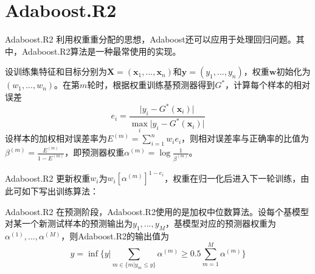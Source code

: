 \documentclass{ctexbeamer}        %
\begin{document}
\section{Adaboost.R2}
\begin{frame}{Adaboost.R2}
利用权重重分配的思想，Adaboost还可以应用于处理回归问题。其中，Adaboost.R2算法是一种最常使用的实现。
\newline

设训练集特征和目标分别为$\mathbf{X}=(\mathbf{x}_1, ..., \mathbf{x}_n)$和$\mathbf{y}=(y_1,...,y_n)$，权重$\mathbf{w}$初始化为$(w_1,...,w_n)$。在第$m$轮时，根据权重训练基预测器得到$G^*$，计算每个样本的相对误差
$$
e_{i}=\frac{\vert y_i-G^*(\mathbf{x}_i)\vert}{\max_i \vert y_i-G^*(\mathbf{x}_i)\vert}
$$
设样本的加权相对误差率为$E^{(m)}=\sum_{i=1}^n w_ie_i$，则相对误差率与正确率的比值为$\beta^{(m)}=\frac{E^{(m)}}{1-E^{(m)}}$，即预测器权重$\alpha^{(m)}=\log \frac{1}{\beta^{(m)}}$。
\end{frame}
\begin{frame}{Adaboost.R2}
更新权重$w_i$为$w_{i}[\alpha^{(m)}]^{1-e_{i}}$，权重在归一化后进入下一轮训练，由此可如下写出训练算法：
\begin{center}
\end{center}

\end{frame}
\begin{frame}{Adaboost.R2}
在预测阶段，Adaboost.R2使用的是加权中位数算法。设每个基模型对某一个新测试样本的预测输出为$y_1,...,y_M$，基模型对应的预测器权重为$\alpha^{(1)},...,\alpha^{(M)}$，则Adaboost.R2的输出值为
$$
y=\inf \{ y\big| \sum_{m\in \{m\vert y_m\leq y\}}\alpha^{(m)} \geq 0.5 \sum_{m=1}^M\alpha^{(m)}\}
$$
\end{frame}
\end{document}
